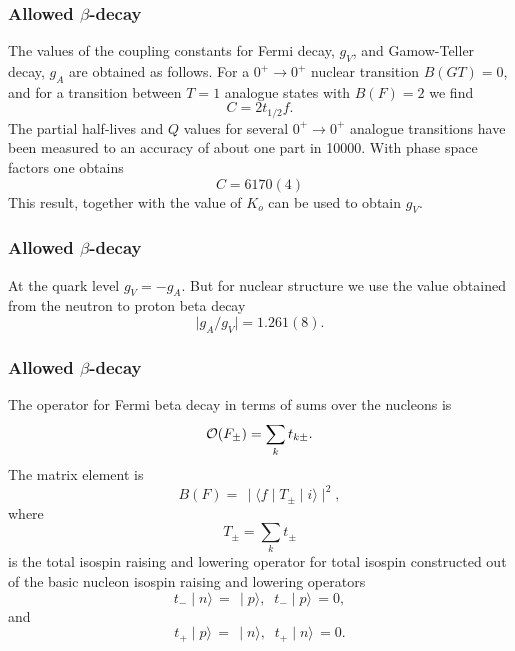 \documentclass[compress]{beamer}
\begin{document}
\frame
{
\frametitle{Allowed $\beta$-decay}
\begin{small}
{\scriptsize
     The values of the coupling constants for Fermi decay,
$  g_{V}  $, and Gamow-Teller decay, $  g_{A}  $ are obtained as follows.
For a $  0^{+} \rightarrow  0^{+}  $ nuclear transition $  B(GT) = 0  $, and for a
transition between $  T=1  $ analogue states with $  B(F)=2  $ we find 
\[
       C = 2 t_{1/2} f.  
\]
The partial half-lives and $  Q  $ values for several $  0^{+} \rightarrow  0^{+}  $ analogue
transitions have been measured to an accuracy of about one part in
10000. With  phase space factors one obtains 
\[
      C = 6170(4)    
\]
This result, together with the value of $  K_{o}  $ can be used to obtain $  g_{V}  $.
}
\end{small}
}
\frame
{
\frametitle{Allowed $\beta$-decay}
\begin{small}
{\scriptsize
At the quark level $  g_{V}=-g_{A}  $.
But for nuclear structure we use the value obtained from the
neutron to proton beta decay
\[
     \mid g_{A}/g_{V}\mid  = 1.261(8). 
\]
}
\end{small}
}
\frame
{
\frametitle{Allowed $\beta$-decay}
\begin{small}
{\scriptsize
The operator for Fermi beta decay in terms of sums
over the nucleons is
\[
{\cal O}(F_{\pm}) =  \displaystyle\sum _{k} t_{k\pm}.
\]
The matrix element is
\[
B(F) =\, \mid \langle f\mid  T_{\pm} \mid i\rangle\mid ^{2}, 
\]
where
\[
T_{\pm} = \displaystyle\sum _{k} t_{\pm}  
\]
is the total isospin raising and lowering operator for total
isospin constructed out of the
basic nucleon isospin raising and lowering operators
\[
t_{-}\mid n\rangle\, =\, \mid p\rangle, \;\; t_{-}\mid p\rangle\, = 0,
\]
and
\[
t_{+}\mid p\rangle\, =\, \mid n\rangle, \;\; t_{+}\mid n\rangle\, = 0.  
\]
}
\end{small}
}
\end{document}
